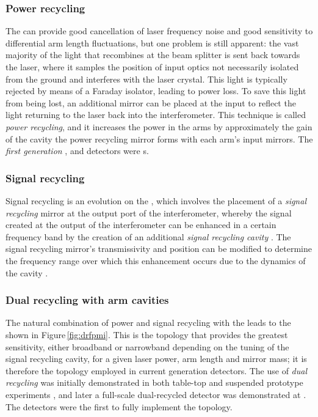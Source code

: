 \subsubsection{\label{sec:power-recycling}Power recycling}
The \FPMI{} can provide good cancellation of laser frequency noise and good sensitivity to differential arm length fluctuations, but one problem is still apparent: the vast majority of the light that recombines at the beam splitter is sent back towards the laser, where it samples the position of input optics not necessarily isolated from the ground and interferes with the laser crystal. This light is typically rejected by means of a Faraday isolator, leading to power loss. To save this light from being lost, an additional mirror can be placed at the input to reflect the light returning to the laser back into the interferometer. This technique is called \emph{power recycling}, and it increases the power in the arms by approximately the gain of the cavity the power recycling mirror forms with each arm's input mirrors. The \emph{first generation} \ILIGO{}, \IVIRGO{} and \IVIRGO{} detectors were \PRFPMI{}s.

\subsubsection{\label{sec:signal-recycling}Signal recycling}
Signal recycling is an evolution on the \PRFPMI{}, which involves the placement of a \emph{signal recycling} mirror at the output port of the interferometer, whereby the signal created at the output of the interferometer can be enhanced in a certain frequency band by the creation of an additional \emph{signal recycling cavity} \cite{Meers1988}. The signal recycling mirror's transmissivity and position can be modified to determine the frequency range over which this enhancement occurs due to the dynamics of the cavity \cite{Buonanno2001}.

\subsubsection{Dual recycling with \FP{} arm cavities}
The natural combination of power and signal recycling with the \FPMI{} leads to the \emph{\DRFPMI{}} shown in Figure\,\ref{fig:drfpmi}. This is the topology that provides the greatest sensitivity, either broadband or narrowband depending on the tuning of the signal recycling cavity, for a given laser power, arm length and mirror mass; it is therefore the topology employed in current generation detectors. The use of \emph{dual recycling} was initially demonstrated in both table-top and suspended prototype experiments \cite{Strain1991, Heinzel1998, Freise2000}, and later a full-scale dual-recycled \MI{} detector was demonstrated at \GEO{} \cite{Heinzel2002, Grote2004}. The \ALIGO{} detectors were the first to fully implement the \DRFPMI{} topology.

